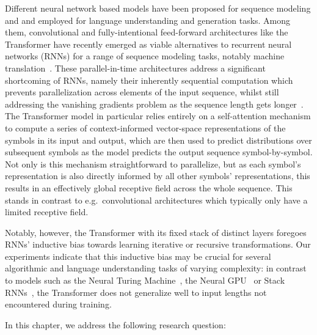 Different neural network based models have been proposed for sequence modeling and and employed for language understanding and generation tasks. Among them, convolutional and fully-intentional feed-forward architectures like the Transformer have recently emerged as viable alternatives to recurrent neural networks (RNNs) for a range of sequence modeling tasks, notably machine translation~\citep{JonasFaceNet2017,transformer}. These parallel-in-time architectures address a significant shortcoming of RNNs, namely their inherently sequential computation which prevents parallelization across elements of the input sequence, whilst still addressing the vanishing gradients problem as the sequence length gets longer~\citep{vanishing-exploding-gradient}.
The Transformer model in particular relies entirely on a self-attention mechanism \citep{decomposableAttnModel,lin2017structured} to compute a series of context-informed vector-space representations of the symbols in its input and output, which are then used to predict distributions over subsequent symbols as the model predicts the output sequence symbol-by-symbol. Not only is this mechanism straightforward to parallelize, but as each symbol's representation is also directly informed by all other symbols' representations, this results in an effectively global receptive field across the whole sequence. This stands in contrast to e.g.\ convolutional architectures which typically only have a limited receptive field.

Notably, however, the Transformer with its fixed stack of distinct layers foregoes RNNs' inductive bias towards learning iterative or recursive transformations. Our experiments indicate that this inductive bias may be crucial for several algorithmic and language understanding tasks of varying complexity: in contrast to models such as the Neural Turing Machine~\citep{ntm14}, the Neural GPU~\citep{neural_gpu} or Stack RNNs~\citep{stack_rnn}, the Transformer does not generalize well to input lengths not encountered during training. 

In this chapter, we address the following research question:

